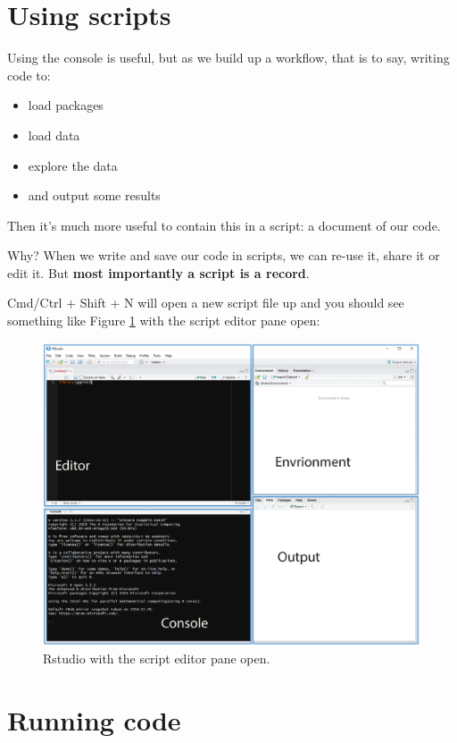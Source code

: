 \documentclass[12pt,]{book}
\providecommand{\tightlist}{%
  \setlength{\itemsep}{0pt}\setlength{\parskip}{0pt}}
\theoremstyle{definition}
\theoremstyle{definition}
\theoremstyle{definition}
\theoremstyle{remark}
\begin{document}
\section{Using scripts}\label{using-scripts}

Using the console is useful, but as we build up a workflow, that is to
say, writing code to:

\begin{itemize}
\tightlist
\item
  load packages
\item
  load data
\item
  explore the data
\item
  and output some results
\end{itemize}

Then it's much more useful to contain this in a script: a document of
our code.

Why? When we write and save our code in scripts, we can re-use it, share
it or edit it. But \textbf{most importantly a script is a record}.

Cmd/Ctrl + Shift + N will open a new script file up and you should see
something like Figure \ref{fig:script-pane} with the script editor pane
open:



\begin{figure}

{\centering \includegraphics[width=0.8\linewidth]{img/rstudio_screenshot_four_panes} 

}

\caption{Rstudio with the script editor pane open.}\label{fig:script-pane}
\end{figure}

\section{Running code}\label{running-code}
\end{document}
